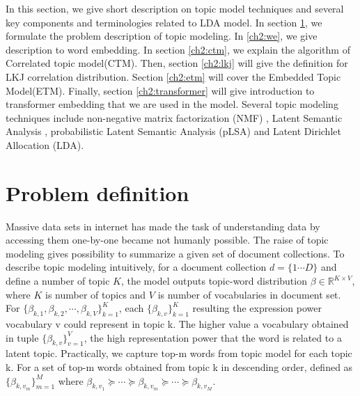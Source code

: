 In this section, we give short description on topic model techniques and several key components and terminologies related to LDA model. In section \ref{ch2:tm}, we formulate the problem description of topic modeling. In \ref{ch2:we}, we give description to word embedding. In section \ref{ch2:ctm}, we explain the algorithm of Correlated topic model(CTM). Then,  section \ref{ch2:lkj} will give the definition for LKJ correlation distribution. Section \ref{ch2:etm} will cover the Embedded Topic Model(ETM). Finally, section \ref{ch2:transformer} will give introduction to transformer embedding that we are used in the model. Several topic modeling techniques include non-negative matrix factorization (NMF) \cite{lee_learning_1999}, Latent Semantic Analysis \cite{landauer_solution_1997}, probabilistic Latent Semantic Analysis (pLSA) \cite{hofmann_probabilistic_2013} and Latent Dirichlet Allocation (LDA)\cite{blei_latent_2003}.
\section{Problem definition}\label{ch2:tm} Massive data sets in internet has made the task of understanding data by accessing them one-by-one became not humanly possible. The raise of topic modeling gives possibility to summarize a given set of document collections. To describe topic modeling intuitively, for a document collection $ d=\{1\cdots D\} $ and define a number of topic $ K $, the model outputs topic-word distribution $\beta\in\mathbb{R}^{K\times V}$, where $ K $ is number of topics and $ V $ is number of vocabularies in document set. For $ \{\beta_{k,1},\beta_{k,2},\cdots,\beta_{k,V}\}^{K}_{k=1} $, each $ \{\beta_{k,v}\}^{K}_{k=1} $ resulting the expression power vocabulary v could represent in topic k. The higher value a vocabulary obtained in tuple $ \{\beta_{k,v}\}^{V}_{v=1} $, the high representation power that the word is related to a latent topic. Practically, we capture top-m words from topic model for each topic k. For a set of top-m words obtained from topic k in descending order, defined as $ \{\beta_{k,v_m}\}^{M}_{m=1} $ where $ \beta_{k,v_1}\succeq\cdots\succeq\beta_{k,v_m}\succeq\cdots\succeq\beta_{k,v_M} $.
